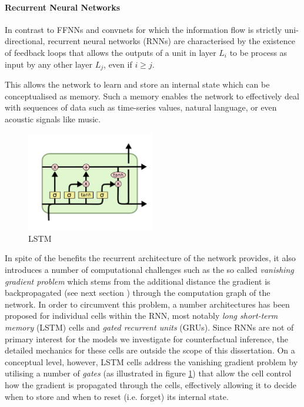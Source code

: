 \paragraph{Recurrent Neural Networks} In contrast to FFNNs and convnets for which the information flow is strictly uni-directional, recurrent neural networks (RNNs) are characterised by the existence of feedback loops that allows the outputs of a unit in layer $L_i$ to be process as input by any other layer $L_j$, even if $i \geq j$.

This allows the network to learn and store an internal state which can be conceptualised as memory. Such a memory enables the network to effectively deal with sequences of data such as time-series values, natural language, or even acoustic signals like music. 

\begin{figure}
	\centering
	\includegraphics[width=0.5\textwidth]{figures/chapter-2/lstm.png}
	\caption{LSTM}\label{fig:lstm}   
\end{figure}

In spite of the benefits the recurrent architecture of the network provides, it also introduces a number of computational challenges such as the so called \emph{vanishing gradient problem} which stems from the additional distance the gradient is backpropagated (see next section %
) through the computation graph of the network. In order to circumvent this problem, a number architectures has been proposed for individual cells within the RNN, most notably \emph{long short-term memory} (LSTM) cells and \emph{gated recurrent units} (GRUs). Since RNNs are not of primary interest for the models we investigate for counterfactual inference, the detailed mechanics for these cells are outside the scope of this dissertation.  On a conceptual level, however, LSTM cells address the vanishing gradient problem by utilising a number of \emph{gates} (as illustrated in figure \ref{fig:lstm}) that allow the cell control how the gradient is propagated through the cells, effectively allowing it to decide when to store and when to reset (i.e. forget) its internal state.

